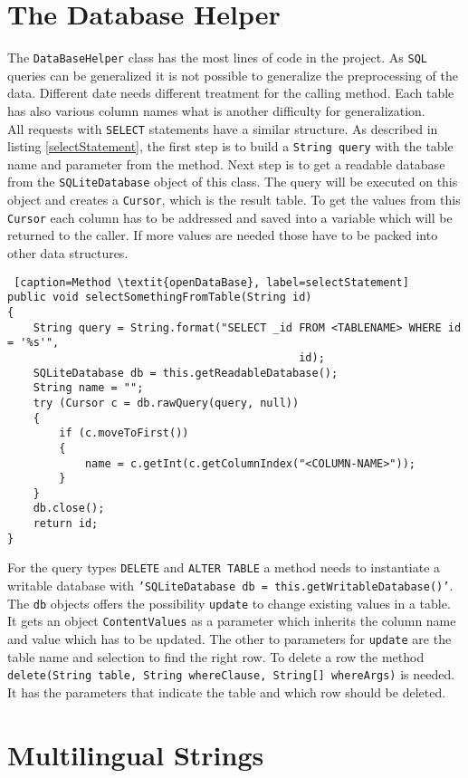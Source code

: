 \section{The Database Helper}

The \texttt{DataBaseHelper} class has the most lines of code in the project. As \texttt{SQL} queries can be generalized it is not possible to generalize the preprocessing of the data. Different date needs different treatment for the calling method. Each table has also various column names what is another difficulty for generalization. \\
All requests with \texttt{SELECT} statements have a similar structure. As described in listing \ref{selectStatement}, the first step is to build a \texttt{String query} with the table name and parameter from the method. Next step is to get a readable database from the \texttt{SQLiteDatabase} object of this class. The query will be executed on this object and creates a \texttt{Cursor}, which is the result table. To get the values from this \texttt{Cursor} each column has to be addressed and saved into a variable which will be returned to the caller. If more values are needed those have to be packed into other data structures.
\begin{lstlisting} [caption=Method \textit{openDataBase}, label=selectStatement] 
public void selectSomethingFromTable(String id)
{
	String query = String.format("SELECT _id FROM <TABLENAME> WHERE id = '%s'",
											 id);
	SQLiteDatabase db = this.getReadableDatabase();
	String name = "";
	try (Cursor c = db.rawQuery(query, null))
	{
		if (c.moveToFirst())
		{
			name = c.getInt(c.getColumnIndex("<COLUMN-NAME>"));
		}
	}
	db.close();
	return id;
}
\end{lstlisting}
For the query types \texttt{DELETE} and \texttt{ALTER TABLE} a method needs to instantiate a writable database with \texttt{'SQLiteDatabase db = this.getWritableDatabase()'}. The \texttt{db} objects offers the possibility \texttt{update} to change existing values in a table. It gets an object \texttt{ContentValues} as a parameter which inherits the column name and value which has to be updated. The other to parameters for \texttt{update} are the table name and selection to find the right row. To delete a row the method \texttt{delete(String table, String whereClause, String[] whereArgs)} is needed. It has the parameters that indicate the table and which row should be deleted.

\section{Multilingual Strings}

